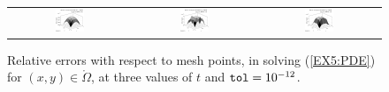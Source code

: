 \documentclass[a4paper,10pt]{report}%
\begin{document}
\begin{figure}[htb]
\centering
\begin{tabular}{ccc}
 \includegraphics[width=0.25\textwidth]{./FIGS/EX5/EX5_accuracy4_1.eps} &
 \includegraphics[width=0.25\textwidth]{./FIGS/EX5/EX5_accuracy4_2.eps} &
 \includegraphics[width=0.25\textwidth]{./FIGS/EX5/EX5_accuracy4_3.eps} \\
\end{tabular}
\caption{\small Relative errors with respect to mesh points, in solving (\ref{EX5:PDE}) for
$(x,y)\in\mathring{\Omega}$, at three values of $t$ and ${\tt tol}=10^{-12}$.}
\label{EX5_accuracy4}
\end{figure}
\end{document}
